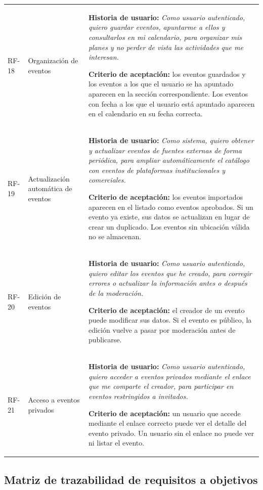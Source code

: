 {\begin{longtable}{@{}>{\raggedright\arraybackslash}p{} >{\raggedright\arraybackslash}p{} >{\raggedright\arraybackslash}p{}@{}}
\addlinespace
RF-18 & Organización de eventos & \textbf{Historia de usuario:} \textit{Como usuario autenticado, quiero guardar eventos, apuntarme a ellos y consultarlos en mi calendario, para organizar mis planes y no perder de vista las actividades que me interesan.}\par\vspace{0.05cm}\textbf{Criterio de aceptación:} los eventos guardados y los eventos a los que el usuario se ha apuntado aparecen en la sección correspondiente. Los eventos con fecha a los que el usuario está apuntado aparecen en el calendario en su fecha correcta. \\
\addlinespace
RF-19 & Actualización automática de eventos & \textbf{Historia de usuario:} \textit{Como sistema, quiero obtener y actualizar eventos de fuentes externas de forma periódica, para ampliar automáticamente el catálogo con eventos de plataformas institucionales y comerciales.}\par\vspace{0.05cm}\textbf{Criterio de aceptación:} los eventos importados aparecen en el listado como eventos aprobados. Si un evento ya existe, sus datos se actualizan en lugar de crear un duplicado. Los eventos sin ubicación válida no se almacenan. \\
\addlinespace
RF-20 & Edición de eventos & \textbf{Historia de usuario:} \textit{Como usuario autenticado, quiero editar los eventos que he creado, para corregir errores o actualizar la información antes o después de la moderación.}\par\vspace{0.05cm}\textbf{Criterio de aceptación:} el creador de un evento puede modificar sus datos. Si el evento es público, la edición vuelve a pasar por moderación antes de publicarse. \\
\addlinespace
RF-21 & Acceso a eventos privados & \textbf{Historia de usuario:} \textit{Como usuario autenticado, quiero acceder a eventos privados mediante el enlace que me comparte el creador, para participar en eventos restringidos a invitados.}\par\vspace{0.05cm}\textbf{Criterio de aceptación:} un usuario que accede mediante el enlace correcto puede ver el detalle del evento privado. Un usuario sin el enlace no puede ver ni listar el evento. \\
\end{longtable}
}

\subsection{Matriz de trazabilidad de requisitos a objetivos}

